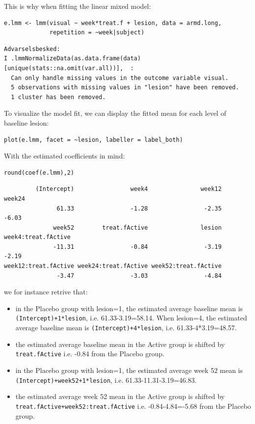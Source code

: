 \documentclass[12pt]{article}
\begin{document}
This is why when fitting the linear mixed model:
\lstset{language=r,label= ,caption= ,captionpos=b,numbers=none}
\begin{lstlisting}
e.lmm <- lmm(visual ~ week*treat.f + lesion, data = armd.long,
             repetition = ~week|subject)
\end{lstlisting}

\begin{verbatim}
Advarselsbesked:
I .lmmNormalizeData(as.data.frame(data)[unique(stats::na.omit(var.all))],  :
  Can only handle missing values in the outcome variable visual. 
  5 observations with missing values in "lesion" have been removed. 
  1 cluster has been removed.
\end{verbatim}


To visualize the model fit, we can display the fitted mean for each
level of baseline lesion:
\lstset{language=r,label= ,caption= ,captionpos=b,numbers=none}
\begin{lstlisting}
plot(e.lmm, facet = ~lesion, labeller = label_both)
\end{lstlisting}

With the estimated coefficients in mind:
\lstset{language=r,label= ,caption= ,captionpos=b,numbers=none}
\begin{lstlisting}
round(coef(e.lmm),2)
\end{lstlisting}

\begin{verbatim}
         (Intercept)                week4               week12               week24 
               61.33                -1.28                -2.35                -6.03 
              week52        treat.fActive               lesion  week4:treat.fActive 
              -11.31                -0.84                -3.19                -2.19 
week12:treat.fActive week24:treat.fActive week52:treat.fActive 
               -3.47                -3.03                -4.84
\end{verbatim}


we for instance retrive that:
\begin{itemize}
\item in the Placebo group with lesion=1, the estimated average baseline mean
is \texttt{(Intercept)+1*lesion}, i.e. 61.33-3.19=58.14. When lesion=4, the
estimated average baseline mean is \texttt{(Intercept)+4*lesion},
i.e. 61.33-4*3.19=48.57.
\item the estimated average baseline mean in the Active group is shifted
by \texttt{treat.fActive} i.e. -0.84 from the Placebo group.
\item in the Placebo group with lesion=1, the estimated average week 52
mean is \newline \texttt{(Intercept)+week52+1*lesion},
i.e. 61.33-11.31-3.19=46.83.
\item the estimated average week 52 mean in the Active group is shifted by \newline
\texttt{treat.fActive+week52:treat.fActive} i.e. -0.84-4.84=-5.68 from the
Placebo group.
\end{itemize}
\end{document}
